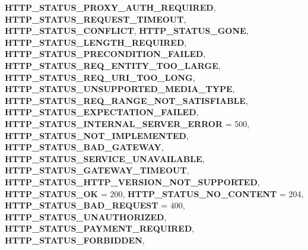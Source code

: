 \begin{DoxyCompactItemize}
{\bfseries H\+T\+T\+P\+\_\+\+S\+T\+A\+T\+U\+S\+\_\+\+P\+R\+O\+X\+Y\+\_\+\+A\+U\+T\+H\+\_\+\+R\+E\+Q\+U\+I\+R\+ED}, 
\newline
{\bfseries H\+T\+T\+P\+\_\+\+S\+T\+A\+T\+U\+S\+\_\+\+R\+E\+Q\+U\+E\+S\+T\+\_\+\+T\+I\+M\+E\+O\+UT}, 
{\bfseries H\+T\+T\+P\+\_\+\+S\+T\+A\+T\+U\+S\+\_\+\+C\+O\+N\+F\+L\+I\+CT}, 
{\bfseries H\+T\+T\+P\+\_\+\+S\+T\+A\+T\+U\+S\+\_\+\+G\+O\+NE}, 
{\bfseries H\+T\+T\+P\+\_\+\+S\+T\+A\+T\+U\+S\+\_\+\+L\+E\+N\+G\+T\+H\+\_\+\+R\+E\+Q\+U\+I\+R\+ED}, 
\newline
{\bfseries H\+T\+T\+P\+\_\+\+S\+T\+A\+T\+U\+S\+\_\+\+P\+R\+E\+C\+O\+N\+D\+I\+T\+I\+O\+N\+\_\+\+F\+A\+I\+L\+ED}, 
{\bfseries H\+T\+T\+P\+\_\+\+S\+T\+A\+T\+U\+S\+\_\+\+R\+E\+Q\+\_\+\+E\+N\+T\+I\+T\+Y\+\_\+\+T\+O\+O\+\_\+\+L\+A\+R\+GE}, 
{\bfseries H\+T\+T\+P\+\_\+\+S\+T\+A\+T\+U\+S\+\_\+\+R\+E\+Q\+\_\+\+U\+R\+I\+\_\+\+T\+O\+O\+\_\+\+L\+O\+NG}, 
{\bfseries H\+T\+T\+P\+\_\+\+S\+T\+A\+T\+U\+S\+\_\+\+U\+N\+S\+U\+P\+P\+O\+R\+T\+E\+D\+\_\+\+M\+E\+D\+I\+A\+\_\+\+T\+Y\+PE}, 
\newline
{\bfseries H\+T\+T\+P\+\_\+\+S\+T\+A\+T\+U\+S\+\_\+\+R\+E\+Q\+\_\+\+R\+A\+N\+G\+E\+\_\+\+N\+O\+T\+\_\+\+S\+A\+T\+I\+S\+F\+I\+A\+B\+LE}, 
{\bfseries H\+T\+T\+P\+\_\+\+S\+T\+A\+T\+U\+S\+\_\+\+E\+X\+P\+E\+C\+T\+A\+T\+I\+O\+N\+\_\+\+F\+A\+I\+L\+ED}, 
{\bfseries H\+T\+T\+P\+\_\+\+S\+T\+A\+T\+U\+S\+\_\+\+I\+N\+T\+E\+R\+N\+A\+L\+\_\+\+S\+E\+R\+V\+E\+R\+\_\+\+E\+R\+R\+OR} = 500, 
{\bfseries H\+T\+T\+P\+\_\+\+S\+T\+A\+T\+U\+S\+\_\+\+N\+O\+T\+\_\+\+I\+M\+P\+L\+E\+M\+E\+N\+T\+ED}, 
\newline
{\bfseries H\+T\+T\+P\+\_\+\+S\+T\+A\+T\+U\+S\+\_\+\+B\+A\+D\+\_\+\+G\+A\+T\+E\+W\+AY}, 
{\bfseries H\+T\+T\+P\+\_\+\+S\+T\+A\+T\+U\+S\+\_\+\+S\+E\+R\+V\+I\+C\+E\+\_\+\+U\+N\+A\+V\+A\+I\+L\+A\+B\+LE}, 
{\bfseries H\+T\+T\+P\+\_\+\+S\+T\+A\+T\+U\+S\+\_\+\+G\+A\+T\+E\+W\+A\+Y\+\_\+\+T\+I\+M\+E\+O\+UT}, 
{\bfseries H\+T\+T\+P\+\_\+\+S\+T\+A\+T\+U\+S\+\_\+\+H\+T\+T\+P\+\_\+\+V\+E\+R\+S\+I\+O\+N\+\_\+\+N\+O\+T\+\_\+\+S\+U\+P\+P\+O\+R\+T\+ED}, 
\newline
{\bfseries H\+T\+T\+P\+\_\+\+S\+T\+A\+T\+U\+S\+\_\+\+OK} = 200, 
{\bfseries H\+T\+T\+P\+\_\+\+S\+T\+A\+T\+U\+S\+\_\+\+N\+O\+\_\+\+C\+O\+N\+T\+E\+NT} = 204, 
{\bfseries H\+T\+T\+P\+\_\+\+S\+T\+A\+T\+U\+S\+\_\+\+B\+A\+D\+\_\+\+R\+E\+Q\+U\+E\+ST} = 400, 
{\bfseries H\+T\+T\+P\+\_\+\+S\+T\+A\+T\+U\+S\+\_\+\+U\+N\+A\+U\+T\+H\+O\+R\+I\+Z\+ED}, 
\newline
{\bfseries H\+T\+T\+P\+\_\+\+S\+T\+A\+T\+U\+S\+\_\+\+P\+A\+Y\+M\+E\+N\+T\+\_\+\+R\+E\+Q\+U\+I\+R\+ED}, 
{\bfseries H\+T\+T\+P\+\_\+\+S\+T\+A\+T\+U\+S\+\_\+\+F\+O\+R\+B\+I\+D\+D\+EN}, 

\end{DoxyCompactItemize}
